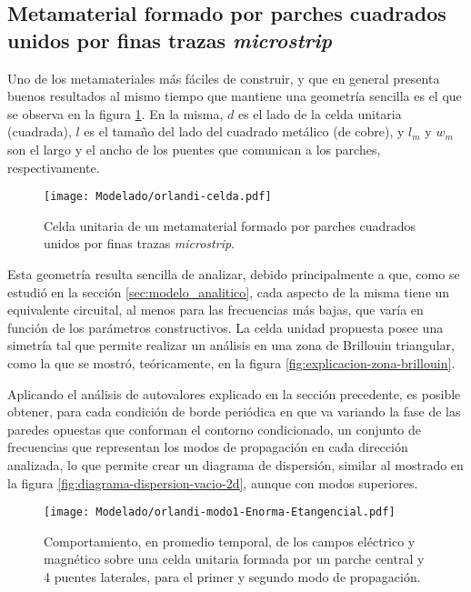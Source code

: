 \subsection{Metamaterial formado por parches cuadrados unidos por finas trazas \textit{microstrip}}
\label{sec:celdas-orlandi}

Uno de los metamateriales más fáciles de construir, y que en general presenta buenos resultados al mismo tiempo que mantiene una geometría sencilla es el que se observa en la figura \ref{fig:celda-orlandi}. En la misma, $d$ es el lado de la celda unitaria (cuadrada), $l$ es el tamaño del lado del cuadrado metálico (de cobre), y $l_m$ y $w_m$ son el largo y el ancho de los puentes que comunican a los parches, respectivamente.

\begin{figure}[h]
	\centering
	\texttt{[image: Modelado/orlandi-celda.pdf]}
	\caption{Celda unitaria de un metamaterial formado por parches cuadrados unidos por finas trazas \textit{microstrip}.}
	\label{fig:celda-orlandi}
\end{figure}

Esta geometría resulta sencilla de analizar, debido principalmente a que, como se estudió en la sección \ref{sec:modelo_analitico}, cada aspecto de la misma tiene un equivalente circuital, al menos para las frecuencias más bajas, que varía en función de los parámetros constructivos. La celda unidad propuesta posee una simetría tal que permite realizar un análisis en una zona de Brillouin triangular, como la que se mostró, teóricamente, en la figura \ref{fig:explicacion-zona-brillouin}.

Aplicando el análisis de autovalores explicado en la sección precedente, es posible obtener, para cada condición de borde periódica en que va variando la fase de las paredes opuestas que conforman el contorno condicionado, un conjunto de frecuencias que representan los modos de propagación en cada dirección analizada, lo que permite crear un diagrama de dispersión, similar al mostrado en la figura \ref{fig:diagrama-dispersion-vacio-2d}, aunque con modos superiores.

\begin{figure}[h]
	\centering
	\texttt{[image: Modelado/orlandi-modo1-Enorma-Etangencial.pdf]}
	\caption{Comportamiento, en promedio temporal, de los campos eléctrico y magnético sobre una celda unitaria formada por un parche central y 4 puentes laterales, para el primer y segundo modo de propagación.}
	\label{fig:orlandi-analisis-campos}
\end{figure}

